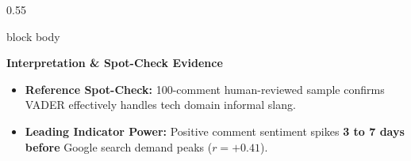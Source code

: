 \documentclass[aspectratio=169, 10pt]{beamer}
\newenvironment{card}[1][]{%
        \begin{beamercolorbox}[rounded=true,shadow=false,wd=\linewidth,sep=3.5pt,#1]{block body}%
        \fontsize{7.8pt}{9.8pt}\selectfont%
    }{%
        \end{beamercolorbox}%
    }
\begin{document}
\begin{frame}[t]
\begin{columns}[T]
\begin{column}{0.55\textwidth}
\begin{card}
                    {\fontsize{7.5pt}{9pt}\selectfont \textbf{\color{NavyPrimary}Interpretation \& Spot-Check Evidence}}\\[0.04cm]                                                                     
                    \begin{itemize}\setlength{\itemsep}{1.5pt}                                                                                                                                         
                        \item \textbf{Reference Spot-Check:} 100-comment human-reviewed sample confirms VADER effectively handles tech domain informal slang.                                          
                        \item \textbf{Leading Indicator Power:} Positive comment sentiment spikes \textbf{3 to 7 days before} Google search demand peaks ($r=+0.41$).                                  
                    \end{itemize}                                                                                                                                                                      
                \end{card}                                                                                                                                                                             
            \end{column}                                                                                                                                                                               
                                                                                                                                                                                                       

\end{columns}
\end{frame}
\end{document}

